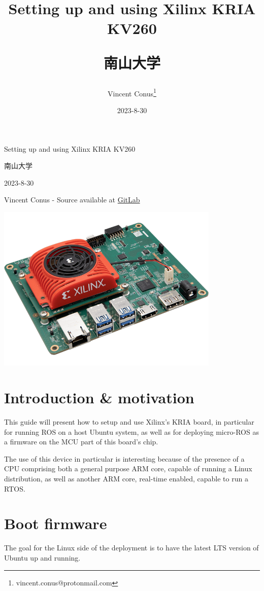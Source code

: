 \documentclass[10pt]{article}
\author{Vincent Conus\thanks{vincent.conus@protonmail.com}}
\date{2023-8-30}
\title{Setting up and using Xilinx KRIA KV260\\\medskip
\large \begin{CJK}{UTF8}{min}南山大学\end{CJK}}
\newcommand{\gitlab}[1]{%
\href{#1}{GitLab \faGitlab}}
\begin{document}
\begin{titlepage}
\centering
{\LARGE Setting up and using Xilinx KRIA KV260 \par }
\vspace{5mm}
{\large \begin{CJK}{UTF8}{min}南山大学\end{CJK} \par}
\vspace{1cm}
{\large 2023-8-30 \par}
\vspace{2cm}
{\large Vincent Conus -  Source available at \gitlab{https://gitlab.com/sunoc/xilinx-kria-kv260-documentation} \par}
\vspace{3cm}
\includegraphics[width=0.8\textwidth]{./img/board}\end{titlepage}
\tableofcontents
\pagebreak
\section{Introduction \& motivation}
\label{sec:org51196b3}
This guide will present how to setup and use Xilinx's KRIA board, in particular
for running ROS on a host Ubuntu system, as well as for deploying
micro-ROS as a firmware on the MCU part of this board's chip.

The use of this device in particular is interesting because of the presence
of a CPU comprising both a general purpose ARM core, capable of running
a Linux distribution, as well as another ARM core, real-time enabled,
capable to run a RTOS.

\section{Boot firmware}
\label{sec:orgca91945}
The goal for the Linux side of the deployment is to
have the latest LTS version of Ubuntu up and running.
\end{document}
